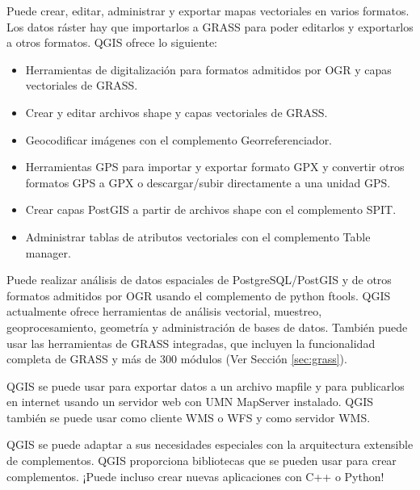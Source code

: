 
Puede crear, editar, administrar y exportar mapas vectoriales en varios formatos. Los datos ráster
hay que importarlos a GRASS para poder editarlos y exportarlos a otros
formatos. QGIS ofrece lo siguiente: 

\begin{itemize}
\item Herramientas de digitalización para formatos admitidos por OGR y capas vectoriales de GRASS.
\item Crear y editar archivos shape y capas vectoriales de GRASS.
\item Geocodificar imágenes con el complemento Georreferenciador.
\item Herramientas GPS para importar y exportar formato GPX y convertir otros formatos GPS
a GPX o descargar/subir directamente a una unidad GPS.
\item Crear capas PostGIS a partir de archivos shape con el complemento SPIT.
\item Administrar tablas de atributos vectoriales con el complemento Table manager.
\end{itemize}


Puede realizar análisis de datos espaciales de PostgreSQL/PostGIS y de otros formatos
admitidos por OGR usando el complemento de python ftools. QGIS actualmente ofrece
herramientas de análisis vectorial, muestreo, geoprocesamiento, geometría y administración de bases de datos. También puede usar las herramientas de GRASS integradas, que 
incluyen la funcionalidad completa de GRASS y más de 300 módulos (Ver
Sección \ref{sec:grass}).


QGIS se puede usar para exportar datos a un archivo mapfile y para publicarlos en
internet usando un servidor web con UMN MapServer instalado. QGIS también se
puede usar como cliente WMS o WFS y como servidor WMS.


QGIS se puede adaptar a sus necesidades especiales con la arquitectura extensible
de complementos. QGIS proporciona bibliotecas que se pueden usar para crear
complementos. ¡Puede incluso crear nuevas aplicaciones con C++ o Python!

